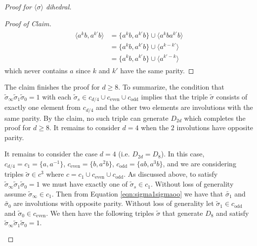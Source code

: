 \documentclass{dcthesis}
\newcommand{\wt}[1]{\widetilde{#1}}
\numberwithin{equation}{section}
\theoremstyle{definition}
\theoremstyle{remark}
\begin{document}
{{\begin{proof}[Proof for $\langle\sigma\rangle$ dihedral]
\begin{proof}[Proof of Claim]
\begin{align}
          \begin{split}
            \label{eqn:generatedbyinvolutions}
            \langle a^kb,a^{k'}b\rangle
            &=
            \{a^kb,a^{k'}b\}
            \cup
            \langle a^kba^{k'}b\rangle\\
            &=
            \{a^kb,a^{k'}b\}
            \cup
            \langle a^{k-k'}\rangle\\
            &=
            \{a^kb,a^{k'}b\}
            \cup
            \langle a^{k'-k}\rangle
          \end{split}
        \end{align}
        which never contains $a$
        since $k$ and $k'$ have the same parity.
      \end{proof}
      The claim finishes the proof
      for $d\geq 8$.
      To summarize,
      the condition that
      $\wt{\sigma}_\infty\wt{\sigma}_1
      \wt{\sigma}_0=1$
      with each $\wt{\sigma}_s\in
      c_{d/4}\cup c_\text{even} \cup
      c_\text{odd}$
      implies that
      the triple $\wt{\sigma}$
      consists of exactly one element from
      $c_{d/4}$
      and the other two elements
      are involutions with the same parity.
      By the claim,
      no such triple can generate $D_{2d}$
      which completes the proof for
      $d\geq 8$.
      It remains to consider $d=4$ when the $2$
      involutions have opposite parity.
      \par
      It remains to consider the case
      $d=4$ (i.e. $D_{2d} = D_8$).
      In this case,
      $c_{d/4} = c_1=\{a,a^{-1}\}$,
      $c_\text{even}=\{b,a^2b\}$,
      $c_\text{odd}=\{ab,a^3b\}$,
      and we are considering triples
      $\wt{\sigma}\in
      c^3$
      where $c=c_1\cup c_\text{even}\cup c_\text{odd}$.
      As discussed above,
      to satisfy $\wt{\sigma}_\infty
      \wt{\sigma}_1\wt{\sigma}_0=1$
      we must have exactly one of
      $\wt{\sigma}_s\in c_1$.
      Without loss of generality assume
      $\wt{\sigma}_\infty\in c_1$.
      Then from Equation \ref{eqn:sigma1sigmaoo}
      we have that $\wt{\sigma_1}$
      and $\wt{\sigma_0}$ are involutions with
      opposite parity.
      Without loss of generality let
      $\wt{\sigma}_1\in c_\text{odd}$
      and $\wt{\sigma}_0\in c_\text{even}$.
      We then have the following triples
      $\wt{\sigma}$ that generate
      $D_8$ and satisfy
      $\wt{\sigma}_\infty\wt{\sigma}_1
      \wt{\sigma}_0=1$.
      \begin{align}
        \label{eqn:possibleD8triples}
        \begin{split}

\end{split}
\end{align}
\end{proof}}}
\end{document}
